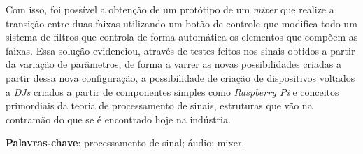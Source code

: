 \begin{resumo}
    Com isso, foi possível a obtenção de um protótipo de um \textit{mixer} que realize a transição entre duas faixas utilizando um botão de controle que modifica todo um sistema de filtros que controla de forma automática os elementos que compõem as faixas.
    Essa solução evidenciou, através de testes feitos nos sinais obtidos a partir da variação de parâmetros, de forma a varrer as novas possibilidades criadas a partir dessa nova configuração, a possibilidade de criação de dispositivos voltados a \textit{DJs} criados a partir de componentes simples como \textit{Raspberry Pi} e conceitos primordiais da teoria de processamento de sinais, estruturas que vão na contramão do que se é encontrado hoje na indústria.
    

 \vspace{\onelineskip}
    
 \noindent
 \textbf{Palavras-chave}: processamento de sinal; áudio; mixer.
\end{resumo}
